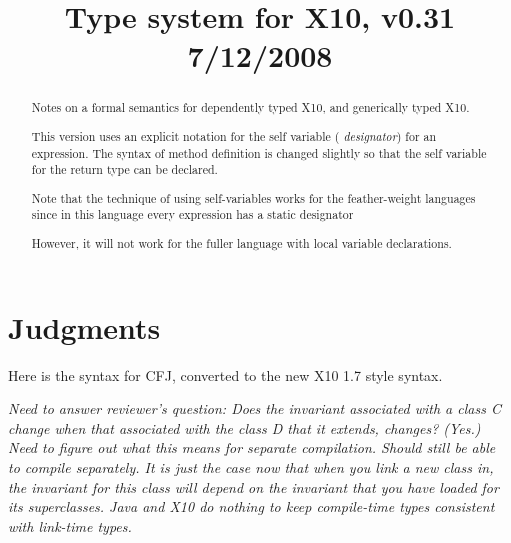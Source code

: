 \documentclass[preprint,nocopyrightspace,9pt]{sigplanconf}
\def\Xten{{\sf X10}}
\def\CFJ{{\sf CFJ}}
\newif\iflncs
\begin{document}
\title{Type system for \Xten, v0.31 7/12/2008}
\iflncs
\author{a}
\else
{}
\fi
\maketitle

\begin{abstract}

Notes on a formal semantics for dependently typed \Xten, and
generically typed \Xten. 

This version uses an explicit notation for the self variable ({\em
designator}) for an expression. The syntax of method definition is
changed slightly so that the self variable for the return type can be
declared.

Note that the technique of using self-variables works for the
feather-weight languages since in this language every expression has a
static designator

 However, it will not work for the fuller
language with local variable declarations.

\end{abstract}

\section{Judgments}

Here is the syntax for \CFJ, converted to the new X10 1.7 style
syntax. 

{\em Need to answer reviewer's question: Does the invariant associated
with a class C change when that associated with the class D that it
extends, changes? (Yes.) Need to figure out what this means for
separate compilation. Should still be able to compile separately. It
is just the case now that when you link a new class in, the invariant
for this class will depend on the invariant that you have loaded for
its superclasses. Java and X10 do nothing to keep compile-time types
consistent with link-time types.}
\end{document}
